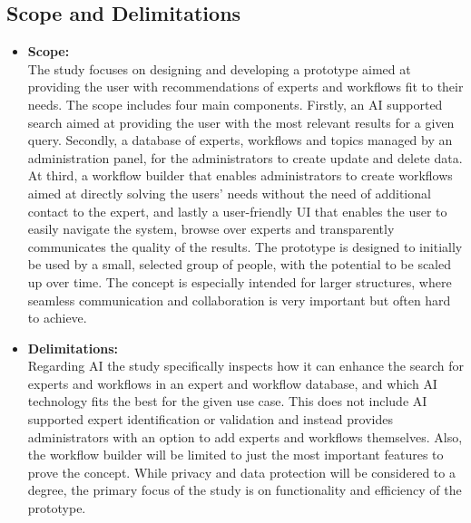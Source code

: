 \subsection{Scope and Delimitations}
\begin{itemize}
    \item \textbf{Scope:}\\
    The study focuses on designing and developing a prototype aimed at providing the user with recommendations of experts and workflows fit to their needs. The scope includes four main components. Firstly, an \ac{AI} supported search aimed at providing the user with the most relevant results for a given query. Secondly, a database of experts, workflows and topics managed by an administration panel, for the administrators to create update and delete data. At third, a workflow builder that enables administrators to create workflows aimed at directly solving the users’ needs without the need of additional contact to the expert, and lastly a user-friendly \ac{UI} that enables the user to easily navigate the system, browse over experts and transparently communicates the quality of the results. The prototype is designed to initially be used by a small, selected group of people, with the potential to be scaled up over time. The concept is especially intended for larger structures, where seamless communication and collaboration is very important but often hard to achieve.
    \item \textbf{Delimitations:}\\
    Regarding \ac{AI} the study specifically inspects how it can enhance the search for experts and workflows in an expert and workflow database, and which \ac{AI} technology fits the best for the given use case. This does not include \ac{AI} supported expert identification or validation and instead provides administrators with an option to add experts and workflows themselves. Also, the workflow builder will be limited to just the most important features to prove the concept. While privacy and data protection will be considered to a degree, the primary focus of the study is on functionality and efficiency of the prototype.
\end{itemize}


